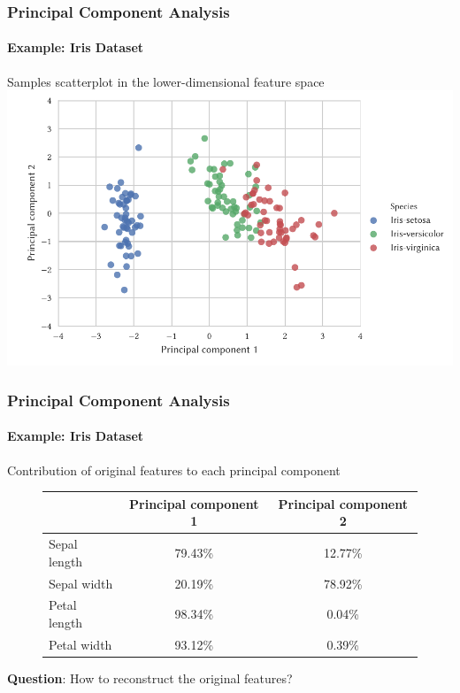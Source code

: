 \documentclass[12pt,a4paper,xcolor=dvipsnames,xcolor=table]{beamer}
\begin{document}
\begin{frame}[t]
    \frametitle{Principal Component Analysis}
    \framesubtitle{Example: Iris Dataset}
    Samples scatterplot in the lower-dimensional feature space
    \includegraphics[width=1\textwidth]{fig/iris_principal_components_scatter}
\end{frame}

\begin{frame}
    \frametitle{Principal Component Analysis}
    \framesubtitle{Example: Iris Dataset}
    Contribution of original features to each principal component 
    \begin{figure}
        \centering
        \begin{tabular}{|l|c|c|}
            \hline
            & Principal component 1 & Principal component 2\\
            \hline
            \hline
            Sepal length & 79.43\% & 12.77\% \\
            Sepal width & 20.19\% & 78.92\% \\
            Petal length & 98.34\% & 0.04\% \\
            Petal width & 93.12\% & 0.39\% \\
            \hline
        \end{tabular}
    \end{figure}
    {\color{Blue} \textbf{Question}}: How to reconstruct the original features?
\end{frame}
\end{document}
